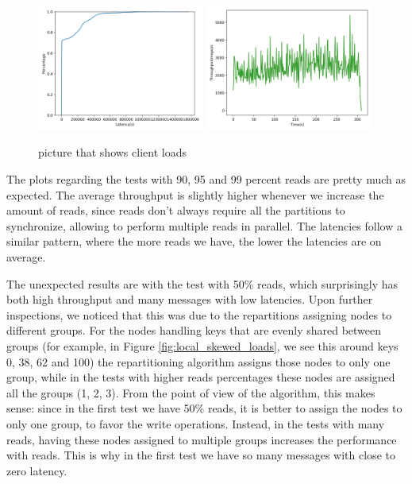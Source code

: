\begin{figure}[!htb]
  \centering
  \includegraphics[width=0.49\textwidth,height=\textheight,keepaspectratio]{img/local1_lat.png}
  \includegraphics[width=0.49\textwidth,height=\textheight,keepaspectratio]{img/local1_tp.png}
  \caption[caption]{ picture that shows client loads }
  \label{fig:local1-performance}
\end{figure}

The plots regarding the tests with 90, 95 and 99 percent reads are pretty much as expected. The average throughput is slightly higher whenever we increase the amount of reads, since reads don't always require all the partitions to synchronize, allowing to perform multiple reads in parallel. The latencies follow a similar pattern, where the more reads we have, the lower the latencies are on average.

The unexpected results are with the test with 50\% reads, which surprisingly has both high throughput and many messages with low latencies. Upon further inspections, we noticed that this was due to the repartitions assigning nodes to different groups. For the nodes handling keys that are evenly shared between groups (for example, in Figure \ref{fig:local_skewed_loads}, we see this around keys 0, 38, 62 and 100) the repartitioning algorithm assigns those nodes to only one group, while in the tests with higher reads percentages these nodes are assigned all the groups (1, 2, 3). From the point of view of the algorithm, this makes sense: since in the first test we have 50\% reads, it is better to assign the nodes to only one group, to favor the write operations. Instead, in the tests with many reads, having these nodes assigned to multiple groups increases the performance with reads. This is why in the first test we have so many messages with close to zero latency.


